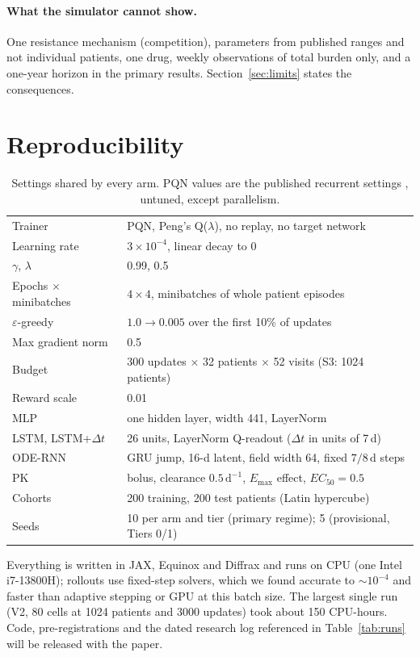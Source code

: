 \documentclass[10pt]{article}
\renewcommand{\cite}{\citep}  %
\begin{document}
\paragraph{What the simulator cannot show.} One resistance mechanism
(competition), parameters from published ranges and not individual patients,
one drug, weekly observations of total burden only, and a one-year horizon in
the primary results. Section~\ref{sec:limits} states the consequences.

\section{Reproducibility}\label{sec:repro}
\begin{table}[h]
\centering\footnotesize
\caption{Settings shared by every arm. PQN values are the published recurrent
settings \cite{gallici2024}, untuned, except parallelism.}
\label{tab:hparams}
\begin{tabular}{@{}ll@{}}
\toprule
Trainer & PQN, Peng's Q($\lambda$), no replay, no target network \\
Learning rate & $3\times10^{-4}$, linear decay to 0 \\
$\gamma$, $\lambda$ & 0.99, 0.5 \\
Epochs $\times$ minibatches & $4\times4$, minibatches of whole patient episodes \\
$\varepsilon$-greedy & $1.0\to0.005$ over the first 10\% of updates \\
Max gradient norm & 0.5 \\
Budget & 300 updates $\times$ 32 patients $\times$ 52 visits (S3: 1024 patients) \\
Reward scale & 0.01 \\
\midrule
MLP & one hidden layer, width 441, LayerNorm \\
LSTM, LSTM+$\Delta t$ & 26 units, LayerNorm Q-readout ($\Delta t$ in units of 7\,d) \\
ODE-RNN & GRU jump, 16-d latent, field width 64, fixed $7/8$\,d steps \\
\midrule
PK & bolus, clearance $0.5\,\mathrm{d}^{-1}$, $E_{\max}$ effect, $EC_{50}=0.5$ \\
Cohorts & 200 training, 200 test patients (Latin hypercube) \\
Seeds & 10 per arm and tier (primary regime); 5 (provisional, Tiers 0/1) \\
\bottomrule
\end{tabular}
\end{table}
Everything is written in JAX, Equinox and Diffrax and runs on CPU (one Intel
i7-13800H); rollouts use fixed-step solvers, which we found accurate to
${\sim}10^{-4}$ and faster than adaptive stepping or GPU at this batch size.
The largest single run (V2, 80 cells at 1024 patients and 3000 updates) took
about 150 CPU-hours. Code, pre-registrations and the dated research log
referenced in Table~\ref{tab:runs} will be released with the paper.
\end{document}
